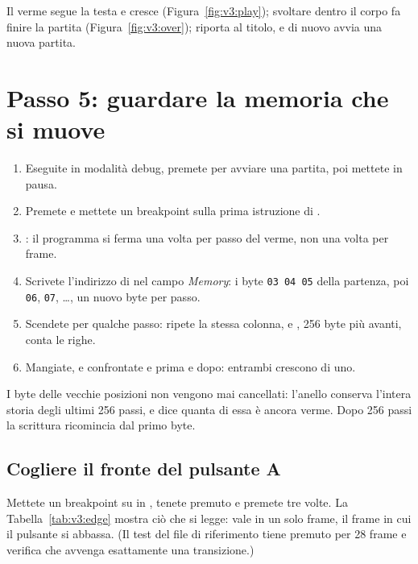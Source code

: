 \begin{prgcheck}
Il verme segue la testa e cresce (Figura~\ref{fig:v3:play}); svoltare dentro
il corpo fa finire la partita (Figura~\ref{fig:v3:over});  riporta al
titolo, e  di nuovo avvia una nuova partita.
\end{prgcheck}

\section{Passo 5: guardare la memoria che si muove}

\begin{prgtry}
\begin{enumerate}[nosep]
\item Eseguite in modalità debug, premete  per avviare una partita, poi
  mettete in pausa.
\item Premete  e mettete un breakpoint sulla prima istruzione di
  .
\item {}: il programma si ferma una volta per passo del verme, non
  una volta per frame.
\item Scrivete l'indirizzo di  nel campo \emph{Memory}: i byte
  \texttt{03 04 05} della partenza, poi \texttt{06}, \texttt{07}, \ldots, un
  nuovo byte per passo.
\item Scendete per qualche passo:  ripete la stessa colonna, e
  , 256 byte più avanti, conta le righe.
\item Mangiate, e confrontate  e  prima e dopo:
  entrambi crescono di uno.
\end{enumerate}
\end{prgtry}

I byte delle vecchie posizioni non vengono mai cancellati: l'anello conserva
l'intera storia degli ultimi 256 passi, e  dice quanta di essa è
ancora verme. Dopo 256 passi la scrittura ricomincia dal primo byte.

\subsection{Cogliere il fronte del pulsante A}

Mettete un breakpoint su  in , tenete
premuto  e premete  tre volte. La
Tabella~\ref{tab:v3:edge} mostra ciò che si legge:  vale  in un
solo frame, il frame in cui il pulsante si abbassa. (Il test del file di
riferimento tiene premuto  per 28 frame e verifica che avvenga
esattamente una transizione.)

